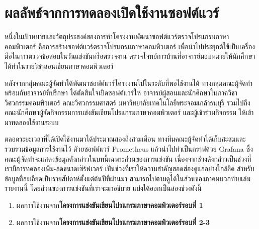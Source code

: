 \documentclass[12pt,one side,openright,a4paper]{cpe-thesis-th}
\newcommand{\thaijustify}[1]{%
  \par\hspace{30pt}\justifying
  #1
}
\begin{document}
\section{ผลลัพธ์จากการทดลองเปิดใช้งานซอฟต์แวร์}
\thaijustify{
  หนึ่งในเป้าหมายและวัตถุประสงค์ของการทำโครงงานพัฒนาซอฟต์แวร์ตรวจโปรแกรมภาษาคอมพิวเตอร์ คือการสร้างซอฟต์แวร์ตรวจโปรแกรมภาษาคอมพิวเตอร์ เพื่อนำไปประยุกต์ใช้เป็นเครื่องมือในการตรวจข้อสอบในวันแข่งขันหรือตรวจงาน ตรวจโจทย์การบ้านที่อาจารย์มอบหมายให้นักศึกษาได้ทำในรายวิชาสอนเขียนภาษาคอมพิวเตอร์
}
\thaijustify{
  หลังจากกลุ่มคณะผู้จัดทำได้พัฒนาซอฟต์แวร์โครงงานไปในระดับที่พอใช้งานได้ ทางกลุ่มคณะผู้จัดทำพร้อมกับอาจารย์ที่ปรึกษา ได้ตัดสินใจเปิดซอฟต์แวร์ให้ อาจารย์ผู้สอนและนักศึกษาในภาควิชาวิศวกรรมคอมพิวเตอร์ คณะวิศวกรรมศาสตร์ มหาวิทยาลัยเทคโนโลยีพระจอมเกล้าธนบุรี รวมไปถึงคณะนักศึกษาผู้จัดกิจกรรมการแข่งขันเขียนโปรแกรมภาษาคอมพิวเตอร์ และผู้เข้าร่วมกิจกรรม ให้เข้ามาทดลองใช้งานระบบ
}
\thaijustify{
  ตลอดระยะเวลาที่ได้เปิดใช้งานมาได้ประมาณสองถึงสามเดือน ทางทีมคณะผู้จัดทำได้เก็บสะสมและรวบรวมข้อมูลการใช้งานไว้ ดัวยซอฟต์แวร์ Prometheus แล้วนำไปทำเป็นกราฟด้วย Grafana ซึ่งคณะผู้จัดทำจะแสดงข้อมูลดังกล่าวในบทนี้เฉพาะส่วนของการแข่งขัน เนื่องจากช่วงดังกล่าวเป็นช่วงที่เรามีการทดลองเพิ่ม-ลดขนาดเซิร์ฟเวอร์ เป็นช่วงที่เราให้ความสำคัญสอดส่องดูแลอย่างใกล้ชิด สำหรับข้อมูลที่ละเอียดเป็นรายสัปดาห์ตั้งแต่ต้นปีที่ผ่านมา สามารถไปตามดูได้ในส่วนของภาคผนวกท้ายเล่มรายงานนี้ โดยส่วนของการแข่งขันที่เราจะมาอธิบาย แบ่งได้ออกเป็นสองช่วงดังนี้
}
\begin{enumerate}
  \item ผลการใช้งานจาก\textbf{โครงการแข่งขันเขียนโปรแกรมภาษาคอมพิวเตอร์รอบที่ 1}
  \item ผลการใช้งานจาก\textbf{โครงการแข่งขันเขียนโปรแกรมภาษาคอมพิวเตอร์รอบที่ 2-3}
\end{enumerate}
\end{document}
